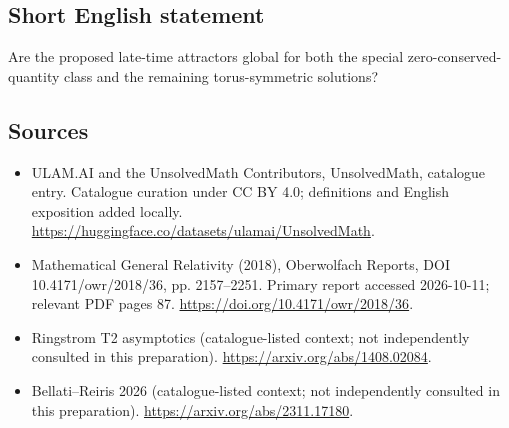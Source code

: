 \documentclass[11pt]{article}
\begin{document}
\subsection{Short English statement}
Are the proposed late-time attractors global for both the special zero-conserved-quantity class and the remaining torus-symmetric solutions?
\subsection{Sources}
\begin{itemize}
\item[\hypertarget{source:statement:1}{S1}] ULAM.AI and the UnsolvedMath Contributors, UnsolvedMath, catalogue entry. Catalogue curation under CC BY 4.0; definitions and English exposition added locally.
\url{https://huggingface.co/datasets/ulamai/UnsolvedMath}.
\item[\hypertarget{source:statement:2}{S2}] Mathematical General Relativity (2018), Oberwolfach Reports, DOI 10.4171/owr/2018/36, pp. 2157--2251. Primary report accessed 2026-10-11; relevant PDF pages 87.
\url{https://doi.org/10.4171/owr/2018/36}.
\item[\hypertarget{source:statement:3}{S3}] Ringstrom T2 asymptotics (catalogue-listed context; not independently consulted in this preparation).
\url{https://arxiv.org/abs/1408.02084}.
\item[\hypertarget{source:statement:4}{S4}] Bellati--Reiris 2026 (catalogue-listed context; not independently consulted in this preparation).
\url{https://arxiv.org/abs/2311.17180}.
\end{itemize}
\label{end:statement}
\end{document}
